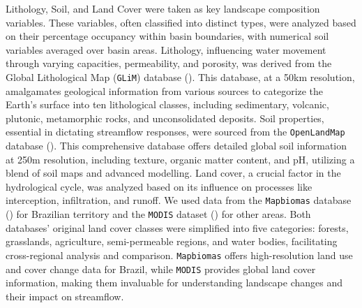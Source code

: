 \documentclass[12pt]{article}
\begin{document}
\par Lithology, Soil, and Land Cover were taken as key landscape composition variables. These variables, often classified into distinct types, were analyzed based on their percentage occupancy within basin boundaries, with numerical soil variables averaged over basin areas. Lithology, influencing water movement through varying capacities, permeability, and porosity, was derived from the Global Lithological Map (\texttt{GLiM}) database (\cite{hartmann2012}). This database, at a 50km resolution, amalgamates geological information from various sources to categorize the Earth's surface into ten lithological classes, including sedimentary, volcanic, plutonic, metamorphic rocks, and unconsolidated deposits. Soil properties, essential in dictating streamflow responses, were sourced from the \texttt{OpenLandMap} database (\cite{hengl2017}). This comprehensive database offers detailed global soil information at 250m resolution, including texture, organic matter content, and pH, utilizing a blend of soil maps and advanced modelling. Land cover, a crucial factor in the hydrological cycle, was analyzed based on its influence on processes like interception, infiltration, and runoff. We used data from the \texttt{Mapbiomas} database (\cite{souza2020}) for Brazilian territory and the \texttt{MODIS} dataset (\cite{friedl201}) for other areas. Both databases' original land cover classes were simplified into five categories: forests, grasslands, agriculture, semi-permeable regions, and water bodies, facilitating cross-regional analysis and comparison. \texttt{Mapbiomas} offers high-resolution land use and cover change data for Brazil, while \texttt{MODIS} provides global land cover information, making them invaluable for understanding landscape changes and their impact on streamflow.
\end{document}
